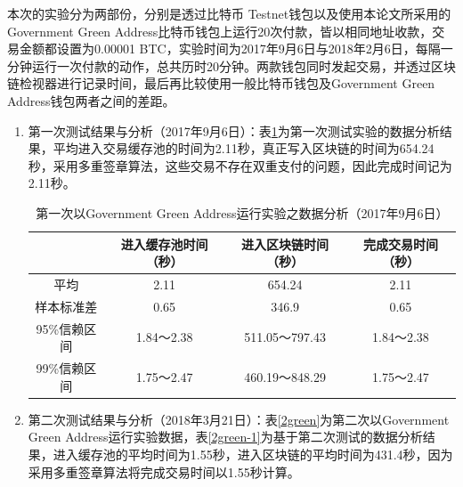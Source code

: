 		本次的实验分为两部份，分别是透过比特币 Testnet钱包以及使用本论文所采用的Government Green Address比特币钱包上运行20次付款，皆以相同地址收款，交易金额都设置为0.00001 BTC，实验时间为2017年9月6日与2018年2月6日，每隔一分钟运行一次付款的动作，总共历时20分钟。两款钱包同时发起交易，并透过区块链检视器进行记录时间，最后再比较使用一般比特币钱包及Government Green Address钱包两者之间的差距。

		\begin{enumerate}
			\item 第一次测试结果与分析（2017年9月6日）：表\ref{1green}为第一次测试实验的数据分析结果，平均进入交易缓存池的时间为2.11秒，真正写入区块链的时间为654.24秒，采用多重签章算法，这些交易不存在双重支付的问题，因此完成时间记为2.11秒。

			\begin{table}[!htbp]
				\centering
				\caption{第一次以Government Green Address运行实验之数据分析（2017年9月6日）}
				\label{1green}
				\begin{tabular}{|c|c|c|c|}
				\hline
				         & 进入缓存池时间（秒） & 进入区块链时间（秒）    & 完成交易时间（秒） \\ \hline
				平均       & 2.11       & 654.24        & 2.11      \\ \hline
				样本标准差    & 0.65       & 346.9         & 0.65      \\ \hline
				95\%信赖区间 & 1.84～2.38  & 511.05～797.43 & 1.84～2.38 \\ \hline
				99\%信赖区间 & 1.75～2.47  & 460.19～848.29 & 1.75～2.47 \\ \hline
				\end{tabular}
				\end{table}

			\item 第二次测试结果与分析（2018年3月21日）：表\ref{2green}为第二次以Government Green Address运行实验数据，表\ref{2green-1}为基于第二次测试的数据分析结果，进入缓存池的平均时间为1.55秒，进入区块链的平均时间为431.4秒，因为采用多重签章算法将完成交易时间以1.55秒计算。

		\end{enumerate}
